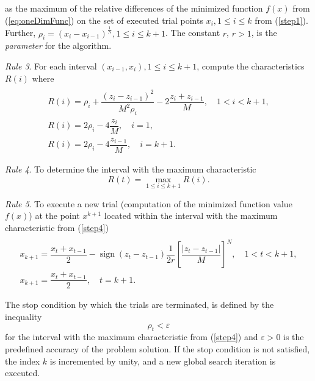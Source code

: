 \documentclass{gOMS2e}
\theoremstyle{plain}%
\theoremstyle{definition}
\DeclareMathOperator{\sign}{sign}
\theoremstyle{remark}
\begin{document}
as the maximum of the relative differences of the minimized function \(f(x)\) from (\ref{eq:oneDimFunc})
on the set of executed trial points \(x_i,1\leqslant i\leqslant k\) from (\ref{step1}). Further, \(\rho_i=(x_i-x_{i-1})^\frac{1}{N},1\leqslant i\leqslant k+1\).
The constant \(r\), \(r>1\), is the \textit{parameter} for the algorithm.
\par
\textit{Rule 3}. For each interval \((x_{i-1},x_i),1\leqslant i\leqslant k+1\), compute the characteristics \(R(i)\) where
\begin{equation}
\label{step3}
\begin{array}{cr}\\
  R(i)=\rho_i+\dfrac{(z_i-z_{i-1})^2}{M^2\rho_i}-2\dfrac{z_i+z_{i-1}}{M},\quad 1<i<k+1, \\
  R(i)=2\rho_i-4\dfrac{z_i}{M},\quad i=1, \\
  R(i)=2\rho_{i}-4\dfrac{z_{i-1}}{M},\quad i=k+1.
\end{array}
\end{equation}
\par
\textit{Rule 4}. To determine the interval with the maximum characteristic
\begin{equation}
\label{step4}
R(t)=\max_{1\leqslant i \leqslant k+1}R(i).
\end{equation}
\par
\textit{Rule 5}. To execute a new trial (computation of the minimized function value \(f(x)\))
at the point \(x^{k+1}\) located within the interval with the maximum characteristic from (\ref{step4})
\begin{equation}
\label{step5}
\begin{array}{cr}\\
  x_{k+1}=\dfrac{x_t+x_{t-1}}{2}-\sign(z_{t}-z_{t-1})\dfrac{1}{2r}\left[\dfrac{|z_{t}-z_{t-1}|}{M}\right]^N,\quad 1<t<k+1, \\
  x_{k+1}=\dfrac{x_t+x_{t-1}}{2},\quad t=k+1.
\end{array}
\end{equation}
\par
The stop condition by which the trials are terminated, is defined by the inequality
\begin{equation}
  \label{eq:stop}
\rho_t<\varepsilon
\end{equation}
for the interval with the maximum characteristic from (\ref{step4}) and \(\varepsilon >0\) is the predefined
accuracy of the problem solution. If the stop condition is not satisfied, the index \(k\) is incremented by unity,
and a new global search iteration is executed.
\end{document}
